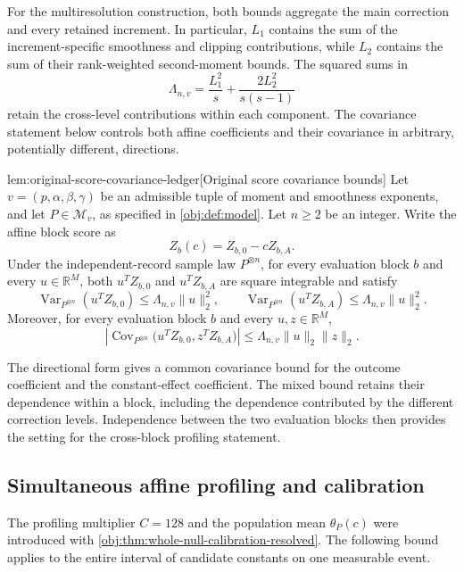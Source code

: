 For the multiresolution construction, both bounds aggregate the main correction and every retained increment. In particular, \(L_1\) contains the sum of the increment-specific smoothness and clipping contributions, while \(L_2\) contains the sum of their rank-weighted second-moment bounds. The squared sums in
\[
\Lambda_{n,v}
=\frac{L_1^2}{s}
+\frac{2L_2^2}{s(s-1)}
\]
retain the cross-level contributions within each component. The covariance statement below controls both affine coefficients and their covariance in arbitrary, potentially different, directions.

\begin{lemmav}{lem:original-score-covariance-ledger}[Original score covariance bounds]
Let \(v=(p,\alpha,\beta,\gamma)\) be an admissible tuple of moment and smoothness exponents, and let \(P\in\mathcal M_v\), as specified in \cref{obj:def:model}. Let \(n\ge 2\) be an integer. Write the affine block score as
\[
Z_b(c)=Z_{b,0}-cZ_{b,A}.
\]
Under the independent-record sample law \(P^{\otimes n}\), for every evaluation block \(b\) and every \(u\in\mathbb R^M\), both \(u^T Z_{b,0}\) and \(u^T Z_{b,A}\) are square integrable and satisfy
\[
\operatorname{Var}_{P^{\otimes n}}(u^T Z_{b,0})
\le \Lambda_{n,v}\|u\|_2^2,
\qquad
\operatorname{Var}_{P^{\otimes n}}(u^T Z_{b,A})
\le \Lambda_{n,v}\|u\|_2^2.
\]
Moreover, for every evaluation block \(b\) and every \(u,z\in\mathbb R^M\),
\[
\left|
\operatorname{Cov}_{P^{\otimes n}}
\bigl(u^T Z_{b,0},z^T Z_{b,A}\bigr)
\right|
\le \Lambda_{n,v}\|u\|_2\|z\|_2.
\]
\end{lemmav}

The directional form gives a common covariance bound for the outcome coefficient and the constant-effect coefficient. The mixed bound retains their dependence within a block, including the dependence contributed by the different correction levels. Independence between the two evaluation blocks then provides the setting for the cross-block profiling statement.

\subsection{Simultaneous affine profiling and calibration}

The profiling multiplier \(C=128\) and the population mean \(\theta_P(c)\) were introduced with \cref{obj:thm:whole-null-calibration-resolved}. The following bound applies to the entire interval of candidate constants on one measurable event.

